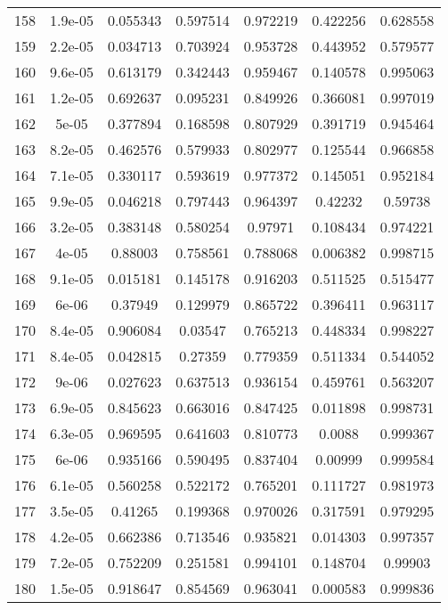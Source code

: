\begin{table}
\begin{tabular}{c|c|c|c|c|c|c}
158 & 1.9e-05 & 0.055343 & 0.597514 & 0.972219 & 0.422256 & 0.628558\\
159 & 2.2e-05 & 0.034713 & 0.703924 & 0.953728 & 0.443952 & 0.579577\\
160 & 9.6e-05 & 0.613179 & 0.342443 & 0.959467 & 0.140578 & 0.995063\\
161 & 1.2e-05 & 0.692637 & 0.095231 & 0.849926 & 0.366081 & 0.997019\\
162 & 5e-05 & 0.377894 & 0.168598 & 0.807929 & 0.391719 & 0.945464\\
163 & 8.2e-05 & 0.462576 & 0.579933 & 0.802977 & 0.125544 & 0.966858\\
164 & 7.1e-05 & 0.330117 & 0.593619 & 0.977372 & 0.145051 & 0.952184\\
165 & 9.9e-05 & 0.046218 & 0.797443 & 0.964397 & 0.42232 & 0.59738\\
166 & 3.2e-05 & 0.383148 & 0.580254 & 0.97971 & 0.108434 & 0.974221\\
167 & 4e-05 & 0.88003 & 0.758561 & 0.788068 & 0.006382 & 0.998715\\
168 & 9.1e-05 & 0.015181 & 0.145178 & 0.916203 & 0.511525 & 0.515477\\
169 & 6e-06 & 0.37949 & 0.129979 & 0.865722 & 0.396411 & 0.963117\\
170 & 8.4e-05 & 0.906084 & 0.03547 & 0.765213 & 0.448334 & 0.998227\\
171 & 8.4e-05 & 0.042815 & 0.27359 & 0.779359 & 0.511334 & 0.544052\\
172 & 9e-06 & 0.027623 & 0.637513 & 0.936154 & 0.459761 & 0.563207\\
173 & 6.9e-05 & 0.845623 & 0.663016 & 0.847425 & 0.011898 & 0.998731\\
174 & 6.3e-05 & 0.969595 & 0.641603 & 0.810773 & 0.0088 & 0.999367\\
175 & 6e-06 & 0.935166 & 0.590495 & 0.837404 & 0.00999 & 0.999584\\
176 & 6.1e-05 & 0.560258 & 0.522172 & 0.765201 & 0.111727 & 0.981973\\
177 & 3.5e-05 & 0.41265 & 0.199368 & 0.970026 & 0.317591 & 0.979295\\
178 & 4.2e-05 & 0.662386 & 0.713546 & 0.935821 & 0.014303 & 0.997357\\
179 & 7.2e-05 & 0.752209 & 0.251581 & 0.994101 & 0.148704 & 0.99903\\
180 & 1.5e-05 & 0.918647 & 0.854569 & 0.963041 & 0.000583 & 0.999836\\
\end{tabular}
\end{table}
